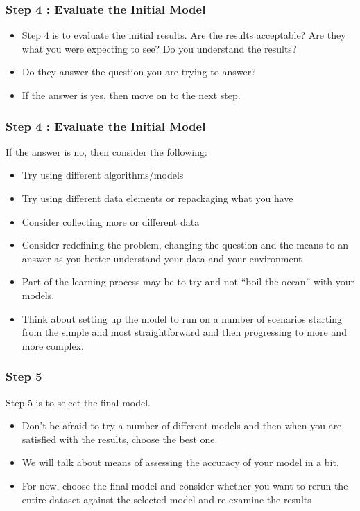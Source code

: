\documentclass[PredictiveAnalytics101.tex]{subfiles}
\begin{document}
\begin{frame}
\frametitle{Step 4 : Evaluate the Initial Model}
\Large
\begin{itemize}
\item Step 4 is to evaluate the initial results. Are the results acceptable? Are they what you were expecting
to see? Do you understand the results? 
\item Do they answer the question you are trying to answer? 
\item If the
answer is yes, then move on to the next step.
\end{itemize}
 
\end{frame}
\begin{frame}
\frametitle{Step 4 : Evaluate the Initial Model}
\Large
If the answer is no, then consider the following:
\begin{itemize}
\item Try using different algorithms/models
\item Try using different data elements or repackaging what you have
\item Consider collecting more or different data
\item Consider redefining the problem, changing the question and the means to an answer as you
better understand your data and your environment
\end{itemize}
\end{frame}
\begin{frame}
\begin{itemize}
\item Part of the learning process may be to try and not “boil the ocean” with your models.
\item Think about
setting up the model to run on a number of scenarios starting from the simple and most straightforward
and then progressing to more and more complex.
\end{itemize}

\end{frame}
\begin{frame}
\frametitle{Step 5} 
Step 5 is to select the final model.
\begin{itemize}
\item Don’t be afraid to try a number of different models and then when
you are satisfied with the results, choose the best one.
\item  We will talk about means of assessing the
accuracy of your model in a bit.
\item For now, choose the final model and consider whether you want to rerun
the entire dataset against the selected model and re-examine the results
\end{itemize} 
\end{frame}
\end{document}
